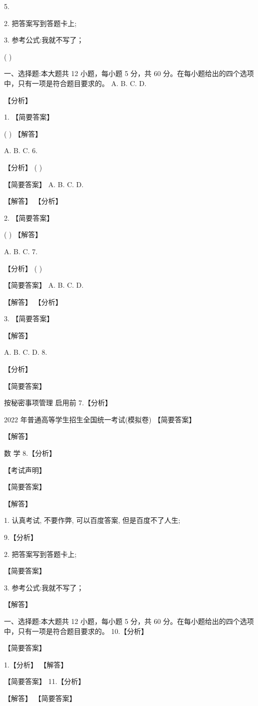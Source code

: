 \documentclass[10pt]{article}
\begin{document}
5.

2. 把答案写到答题卡上;

3. 参考公式:我就不写了；

( )

一、选择题:本大题共 12 小题，每小题 5 分，共 60 分。在每小题给出的四个选项中，只有一项是符合题目要求的。 A. B. C. D.

【分析】

1. 【简要答案】

( ) 【解答】

A. B. C. 6.

【分析】 ( )

【简要答案】 A. B. C. D.

【解答】 【分析】

2. 【简要答案】

( ) 【解答】

A. B. C. 7.

【分析】 ( )

【简要答案】 A. B. C. D.

【解答】 【分析】

3. 【简要答案】

【解答】

A. B. C. D. 8.

【分析】

【简要答案】

按秘密事项管理  启用前 7.【分析】

2022 年普通高等学生招生全国统一考试(模拟卷) 【简要答案】

【解答】

数 学 8.【分析】

【考试声明】

【简要答案】

【解答】

1. 认真考试, 不要作弊, 可以百度答案, 但是百度不了人生;

9.【分析】

2. 把答案写到答题卡上;

【简要答案】

3. 参考公式:我就不写了；

【解答】

一、选择题:本大题共 12 小题，每小题 5 分，共 60 分。在每小题给出的四个选项中，只有一项是符合题目要求的。 10.【分析】

【简要答案】

1.【分析】 【解答】

【简要答案】 11.【分析】

【解答】 【简要答案】
\end{document}
